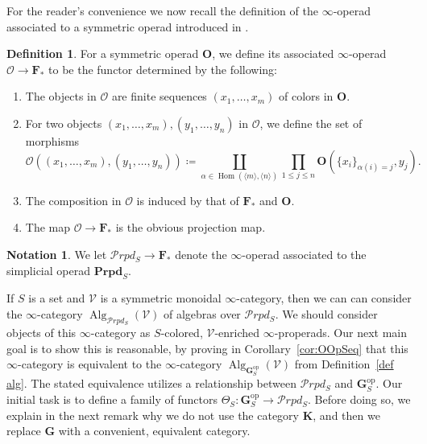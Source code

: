 \documentclass{amsart}
\numberwithin{theorem}{subsection}
\theoremstyle{definition}
\newtheorem{definition}[theorem]{Definition}
\newtheorem{notation}[theorem]{Notation}
\providecommand{\op}{\mathrm{op}}
\newcommand{\xHom}{\operatorname{Hom}}
\newcommand{\finsetskel}{\mathbf{F}}
\newcommand{\pfinsetskel}{\finsetskel_*}
\newcommand{\xAlg}{\operatorname{Alg}}
\newcommand{\xxO}{\mathcal{O}}
\newcommand{\xV}{\mathcal{V}}
\newcommand{\icat}{$\infty$-category}
\newcommand{\bbY}{\mathbf{G}}
\newcommand{\kockgraphs}{\mathbf{K}}
\newcommand{\calproperad}{\mathcal{P}rpd}
\newcommand{\bfproperad}{\mathbf{Prpd}}
\begin{document}
For the reader's convenience we now recall the definition of the $\infty$-operad associated to a symmetric operad introduced in \cite[Construction 2.1.1.7]{ha}.
\begin{definition}
	For a symmetric operad $\mathbf{O}$, we define its associated $\infty$-operad $\xxO\to \pfinsetskel$ to be the functor determined by the following:
	\begin{enumerate}
		\item The objects in $\xxO$ are finite sequences $(x_1,\ldots, x_m)$ of colors in $\mathbf{O}$.
		\item For two objects $(x_1,\ldots, x_m), (y_1,\ldots, y_n)$ in $\xxO$, we define the set of morphisms
		$$\xxO((x_1,\ldots, x_m), (y_1,\ldots, y_n)) \coloneqq \coprod_{\alpha\in \xHom(\langle m\rangle, \langle n\rangle)}\prod_{1\leq j\leq n}\mathbf{O}(\{x_i\}_{\alpha(i)=j}, y_j).$$
		\item The composition in $\xxO$ is induced by that of $\pfinsetskel$ and $\mathbf{O}$.
		\item The map $\xxO\to \pfinsetskel$ is the obvious projection map.
	\end{enumerate}
\end{definition}
\begin{notation}
		We let $\calproperad_S \to \pfinsetskel$ denote the $\infty$-operad associated to the simplicial operad $\bfproperad_S$.
\end{notation}

If $S$ is a set and $\xV$ is a symmetric monoidal $\infty$-category, then we can can consider the \icat{} $\xAlg_{\calproperad_S}(\xV)$ of algebras over $\calproperad_S$.
We should consider objects of this \icat{} as $S$-colored, $\xV$-enriched $\infty$-properads.
Our next main goal is to show this is reasonable, by proving in Corollary~\ref{cor:OOpSeq} that this \icat{} is equivalent to the \icat{} $\xAlg_{\bbY_S^\op}(\xV)$ from Definition~\ref{def alg}.
The stated equivalence utilizes a relationship between $\calproperad_S$ and $\bbY_S^\op$.
Our initial task is to define a family of functors $\Theta_S \colon \bbY^\op_S \to \calproperad_S$.
Before doing so, we explain in the next remark why we do not use the category $\kockgraphs$, and then we replace $\bbY$ with a convenient, equivalent category.
\end{document}
